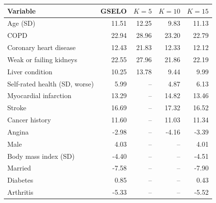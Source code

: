 \begin{tabular}{lrrrr}
\toprule
Variable & GSELO & \(K=5\) & \(K=10\) & \(K=15\)\\
\midrule
Age (SD) & 11.51 & 12.25 & 9.83 & 11.13\\
COPD & 22.94 & 28.96 & 23.20 & 22.79\\
Coronary heart disease & 12.43 & 21.83 & 12.33 & 12.12\\
Weak or failing kidneys & 22.55 & 27.96 & 21.86 & 22.19\\
Liver condition & 10.25 & 13.78 & 9.44 & 9.99\\
Self-rated health (SD, worse) & 5.99 & -- & 4.87 & 6.13\\
Myocardial infarction & 13.29 & -- & 14.82 & 13.46\\
Stroke & 16.69 & -- & 17.32 & 16.52\\
Cancer history & 11.60 & -- & 11.03 & 11.34\\
Angina & -2.98 & -- & -4.16 & -3.39\\
Male & 4.03 & -- & -- & 4.01\\
Body mass index (SD) & -4.40 & -- & -- & -4.51\\
Married & -7.58 & -- & -- & -7.90\\
Diabetes & 0.85 & -- & -- & 0.43\\
Arthritis & -5.33 & -- & -- & -5.52\\
\bottomrule
\end{tabular}
